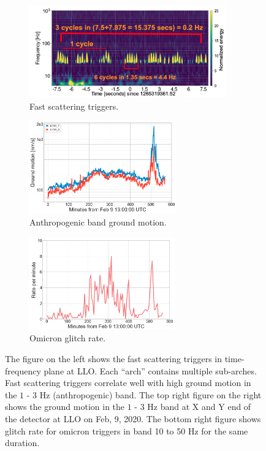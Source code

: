 \documentclass[12pt]{iopart}
\begin{document}
\begin{figure}
\captionsetup[subfigure]{font=scriptsize,labelfont=scriptsize}
   \begin{minipage}{0.5\textwidth}
   \begin{subfigure}[b]{\textwidth}
        \centering
         \includegraphics[width=\textwidth,height=4cm]{fast_scat10.png}
         \caption{Fast scattering triggers.}
         \label{fig:fastscat}
    \end{subfigure}
    \end{minipage}
    \begin{minipage}{0.5\textwidth}
    \begin{subfigure}{\textwidth}
    \includegraphics[width=\textwidth,height=4cm]{anthro_motion1.png}
    \caption{Anthropogenic band ground motion.} \label{subfig:anthro}
    \end{subfigure}

    \vspace*{0.6cm}
    \begin{subfigure}{\textwidth}
    \includegraphics[width=\textwidth,height=4cm]{fast_glitchrate1.png}
    \caption{Omicron glitch rate.} \label{subfig:fast_scat_rate}
    \end{subfigure}
    \end{minipage}
    \caption{The figure on the left shows the fast scattering triggers in time-frequency plane at LLO. Each ``arch'' contains multiple sub-arches. Fast scattering triggers correlate well with high ground motion in the $1$ - $3$ Hz (anthropogenic) band. The top right figure on the right shows the ground motion in the $1$ - $3$ Hz band at X and Y end of the detector at LLO on Feb, 9, 2020. The bottom right figure shows glitch rate for omicron triggers in band 10 to 50 Hz for the same duration. }
    \label{fig:Fast_scattering}

\end{figure}
\end{document}
